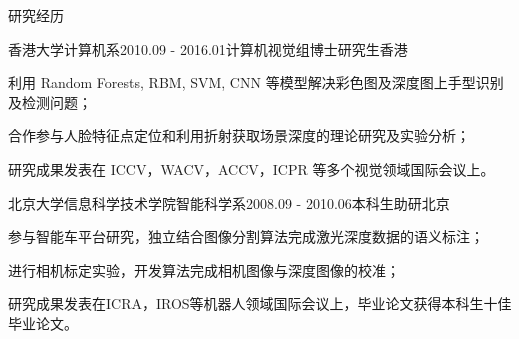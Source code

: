 \documentclass[UTF8]{cv_professional-cn} %
\begin{document}

\begin{rSection}{研究经历}

\begin{rSubsection}{香港大学计算机系}{2010.09 - 2016.01}{计算机视觉组博士研究生}{香港}
	\item 利用 Random Forests, RBM, SVM, CNN 等模型解决彩色图及深度图上手型识别及检测问题；
	\item 合作参与人脸特征点定位和利用折射获取场景深度的理论研究及实验分析；
	\item 研究成果发表在 ICCV，WACV，ACCV，ICPR 等多个视觉领域国际会议上。
\end{rSubsection}

\begin{rSubsection}{北京大学信息科学技术学院智能科学系}{2008.09 - 2010.06}{本科生助研}{北京}
    \item 参与智能车平台研究，独立结合图像分割算法完成激光深度数据的语义标注；
    \item 进行相机标定实验，开发算法完成相机图像与深度图像的校准；
    \item 研究成果发表在ICRA，IROS等机器人领域国际会议上，毕业论文获得本科生十佳毕业论文。
\end{rSubsection}

\end{rSection}

\end{document}
